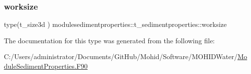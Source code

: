 \mbox{\label{structmodulesedimentproperties_1_1t__sedimentproperties_af17b32fdfd7f286ea8da05a533ee67e7}} 
\subsubsection{\texorpdfstring{worksize}{worksize}}
{\footnotesize\ttfamily type(t\+\_\+size3d ) modulesedimentproperties\+::t\+\_\+sedimentproperties\+::worksize\hspace{0.3cm}{\ttfamily [private]}}



The documentation for this type was generated from the following file\+:\begin{DoxyCompactItemize}
\item 
C\+:/\+Users/administrator/\+Documents/\+Git\+Hub/\+Mohid/\+Software/\+M\+O\+H\+I\+D\+Water/\mbox{\hyperlink{_module_sediment_properties_8_f90}{Module\+Sediment\+Properties.\+F90}}\end{DoxyCompactItemize}
